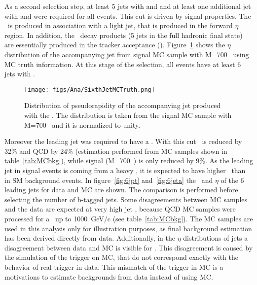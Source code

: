 As a second selection step, at least 5 jets with  and  and at least one additional jet with  and  were required for all events. This cut is driven by signal properties. The \Tp~is produced in association with a light jet, that is produced in the forward $\eta$ region. In addition, the \Tp~decay products (5 jets in the full hadronic final state) are essentially produced in the tracker acceptance (). Figure~\ref{fig:SixthJetTp} shows the $\eta$ distribution of the accompanying jet from signal MC sample with M=700 \GeVcc~using MC truth information. At this stage of the selection, all events have at least 6 jets with . %

\begin{figure}[!Hhtbp]
  \begin{center}
    \texttt{[image: figs/Ana/SixthJetMCTruth.png]}
    \caption{Distribution of pseudorapidity of the accompanying jet produced with the \Tp. The distribution is taken from the signal MC sample with M=700 \GeVcc~and it is normalized to unity.}
    \label{fig:SixthJetTp}
  \end{center}
\end{figure}

Moreover the leading jet was required to have a . With this cut \ttbar~is reduced by 32\% and QCD by 24\% (estimation performed from MC samples shown in table~\ref{tab:MCbkg}), while signal (M=700~\GeVcc) is only reduced by 9\%. As the leading jet in signal events is coming from a heavy \Tp, it is expected to have higher \pt~than in SM background events. In figure~\ref{fig:6jpt} and~\ref{fig:6jeta} the \pt~and $\eta$ of the 6 leading jets for data and MC are shown. The comparison is performed before selecting the number of b-tagged jets. Some disagreements between MC samples and the data are expected at very high jet \pt, because QCD MC samples were processed for a \pt~up to 1000~GeV/c (see table~\ref{tab:MCbkg}). The MC samples are used in this analysis only for illustration purposes, as final background estimation has been derived directly from data. Additionally, in the $\eta$ distributions of jets a disagreement between data and MC is visible for . This disagreement is caused by the simulation of the trigger on MC, that do not correspond exactly with the behavior of real trigger in data. This mismatch of the trigger in MC is a motivations to estimate backgrounds from data instead of using MC. 

